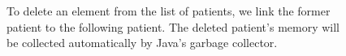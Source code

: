 \begin{figure}[bthp]
  \centering
  
  \caption{To delete an element from the list of patients, we link the
    former patient to the following patient. The deleted patient's
    memory will be collected automatically by Java's garbage
    collector.}
  \label{fig:deletelinklist}
\end{figure}

